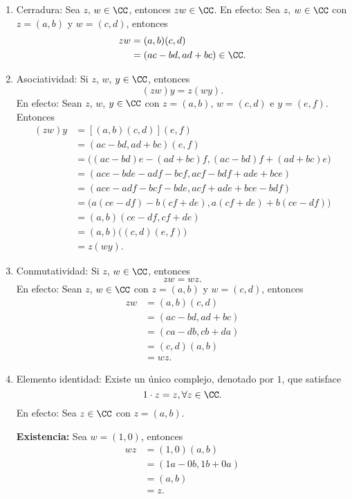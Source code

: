 \begin{enumerate}[resume,label=A\arabic*.]
    \item Cerradura: Sea $z$, $w \in \CC$, entonces $zw \in \CC$. En efecto: Sea $z$, $w \in \CC$ con $z = (a, b)$ y $w = (c, d)$, entonces
    \begin{align*}
        zw & = (a, b)(c, d) \\
        & = (ac - bd, ad + bc) \in \CC.
    \end{align*}
    \item Asociatividad: Si $z$, $w$, $y \in \CC$, entonces
    $$(zw)y = z(wy).$$
    En efecto: Sean $z$, $w$, $y \in \CC$ con $z = (a, b)$, $w = (c, d)$ e $y = (e, f)$. Entonces
    \begin{align*}
        (zw)y & = [(a, b)(c, d)](e, f) \\
        & = (ac - bd, ad + bc)(e, f) \\
        & = \big((ac - bd)e - (ad + bc)f, (ac - bd)f + (ad + bc)e\big) \\
        & = (ace - bde - adf - bcf, acf - bdf + ade + bce) \\
        & = (ace - adf - bcf - bde, acf + ade + bce - bdf) \\
        & = \big(a(ce - df) - b(cf + de), a(cf + de) + b(ce - df)\big) \\
        & = (a, b)(ce - df, cf + de) \\
        & = (a, b)\big((c, d)(e, f)\big) \\
        & = z(wy).
    \end{align*}
    \item Conmutatividad: Si $z$, $w \in \CC$, entonces
    $$zw = wz.$$
    En efecto: Sean $z$, $w \in \CC$ con $z = (a, b)$ y $w = (c, d)$, entonces
    \begin{align*}
        zw & = (a, b)(c, d) \\
        & = (ac - bd, ad + bc) \\
        & = (ca - db, cb + da) \\
        & = (c, d)(a, b) \\
        & = wz.
    \end{align*}
    \newpage
    \item Elemento identidad: Existe un único complejo, denotado por $1$, que satisface
    $$1 \cdot z = z, \forall z \in \CC.$$
    En efecto: Sea $z \in \CC$ con $z = (a, b)$.
    
    \textbf{Existencia:} Sea $w = (1, 0)$, entonces
    \begin{align*}
        wz & = (1, 0)(a, b) \\
        & = (1a - 0b, 1b + 0a) \\
        & = (a, b) \\
        & = z.
    \end{align*}
    

\end{enumerate}
